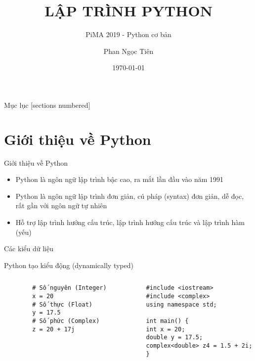 \documentclass[10pt]{beamer}
\title{LẬP TRÌNH PYTHON}
\subtitle{PiMA 2019 - Python cơ bản}
\date{\today}
\date{}
\author{Phan Ngọc Tiên}
\institute{York University, Toronto, Canada}
\begin{document}
\maketitle

\begin{frame}{Mục lục}
  [sections numbered]
  \tableofcontents[hideallsubsections]
\end{frame}

\section{Giới thiệu về Python}
\begin{frame}{Giới thiệu về Python}
  \begin{itemize}
    \item Python là ngôn ngữ lập trình bậc cao, ra mắt lần đầu vào năm 1991
    \item Python là ngôn ngữ lập trình đơn giản, cú pháp (syntax) đơn giản, dễ  đọc, rất gần với ngôn ngữ tự nhiên
    \item Hỗ trợ lập trình hướng cấu trúc, lập trình hướng cấu trúc và lập trình hàm (yếu)
  \end{itemize}
\end{frame}
\begin{frame}[fragile]{Các kiểu dữ liệu}
  \item Python tạo kiểu động (dynamically typed)
  \begin{columns}
    \begin{column}{0.4\textwidth}
      \begin{verbatim}
        # Số nguyên (Integer)
        x = 20
        # Số thực (Float)
        y = 17.5
        # Số phức (Complex)
        z = 20 + 17j
      \end{verbatim}
    \end{column}
    \begin{column}{0.7\textwidth}
      \begin{verbatim}
        #include <iostream>
        #include <complex>
        using namespace std;

        int main() {
        int x = 20;
        double y = 17.5;
        complex<double> z4 = 1.5 + 2i;
        }
      \end{verbatim}
    \end{column}
  \end{columns}
\end{frame}
\end{document}
